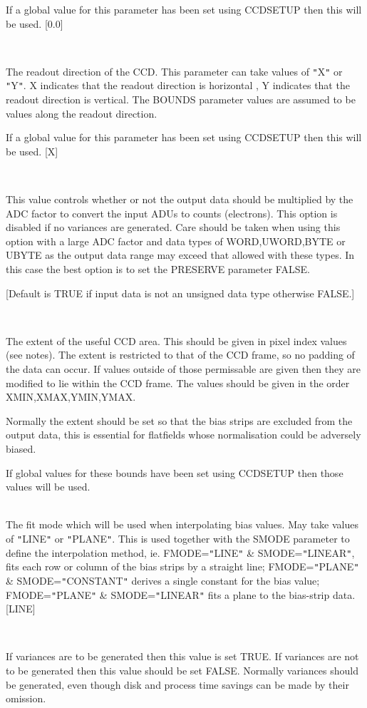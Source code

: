 \documentclass[twoside,11pt]{article}
\newcommand{\htmlref}[2]{#1}
\renewcommand{\_}{\texttt{\symbol{95}}}
\newcommand{\qt}[1]{{\tt "}#1{\tt "}}
\newcommand{\xroutine}[1]{\htmlref{{\sc #1}}{#1}}
\newcommand{\sstsubsection}[1]{ \item[{#1}] \mbox{} \\}
\newcommand{\sstsubsection}[1]{\item[{#1}]}
\begin{document}
{{{         If a global value for this parameter has been set using
         \xroutine{CCDSETUP} then this will be used.
         [0.0]
      }
      \sstsubsection{
         DIRECTION = LITERAL (Read)
      } {
         The readout direction of the CCD. This parameter can take
         values of \qt{X} or \qt{Y}. X indicates that the readout direction is
         horizontal , Y indicates that the readout direction is
         vertical. The BOUNDS parameter values are assumed to be values
         along the readout direction.

         If a global value for this parameter has been set using
         \xroutine{CCDSETUP} then this will be used.
         [X]
      }
      \sstsubsection{
         EXPAND = \_LOGICAL (Read)
      } {
         This value controls whether or not the output data should be
         multiplied by the ADC factor to convert the input ADUs to
         counts (electrons). This option is disabled if no variances
         are generated. Care should be taken when using this option
         with a large ADC factor and data types of \_WORD,\_UWORD,\_BYTE
         or \_UBYTE as the output data range may exceed that allowed
         with these types. In this case the best option is to set
         the PRESERVE parameter FALSE.

         [Default is TRUE if input data is not an unsigned data type
         otherwise FALSE.]
      }
      \sstsubsection{
         EXTENT(4) = \_INTEGER (Read)
      } {
         The extent of the useful CCD area. This should be given in
         pixel index values (see notes). The extent is restricted to
         that of the CCD frame, so no padding of the data can occur. If
         values outside of those permissable are given then they are
         modified to lie within the CCD frame. The values should be
         given in the order XMIN,XMAX,YMIN,YMAX.

         Normally the extent should be set so that the bias strips
         are excluded from the output data, this is essential for
         flatfields whose normalisation could be adversely biased.

         If global values for these bounds have been set using
         \xroutine{CCDSETUP} then those values will be used.
      }
      \sstsubsection{
         FMODE = LITERAL (Read)
      } {
         The fit mode which will be used when interpolating bias values.
         May take values of \qt{LINE} or \qt{PLANE}. This is used together
         with the SMODE parameter to define the interpolation method,
         ie. FMODE=\qt{LINE} \& SMODE=\qt{LINEAR}, fits each row or column of
         the bias strips by a straight line; FMODE=\qt{PLANE} \&
         SMODE=\qt{CONSTANT} derives a single constant for the bias value; \\
         FMODE=\qt{PLANE} \& SMODE=\qt{LINEAR} fits a plane to the bias-strip
         data.
         [LINE]
      }
      \sstsubsection{
         GENVAR = \_LOGICAL (Read)
      } {
         If variances are to be generated then this value is set
         TRUE. If variances are not to be generated then this value
         should be set FALSE. Normally variances should be generated,
         even though disk and process time savings can be made by their
         omission.

}}}
\end{document}
